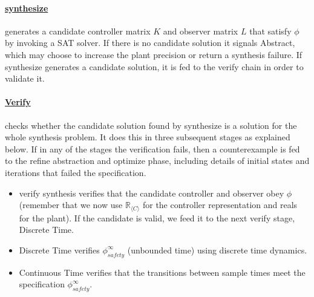 \documentclass[sigconf]{llncs}
\newcommand{\mat}[1]{{#1}}
\begin{document}
\paragraph{\underline{{\sc synthesize}}} generates a candidate controller matrix $\mat{K}$
and observer matrix $\mat{L}$ that satisfy
$\phi$ by invoking a SAT solver.
If there is no candidate solution it signals {\sc Abstract}, 
which may choose to increase the plant precision or return a synthesis failure.
If {\sc synthesize} generates a candidate solution, it is fed to the {\sc verify} chain in order to validate it.
%
\paragraph{\underline{{\sc Verify}}} checks whether the candidate
solution found by {\sc synthesize} is a solution for the whole synthesis
problem. It does this in three subsequent stages as explained below.
If  in any of the stages the verification fails, then
a counterexample is fed to the {\sc refine abstraction and optimize} phase,
including details of initial states
and iterations that failed the specification.
\begin{itemize}
\item {\sc verify synthesis}
verifies that the candidate controller
and observer obey $\phi$ (remember that we now use
$\mathbb{R}_{\langle C \rangle}$ for the controller representation
and reals for the plant).  %
If the candidate is valid, we feed
it to the next {\sc verify} stage, {\sc Discrete Time}.
\item {\sc Discrete Time} verifies $\phi_\mathit{safety}^{\infty}$ (unbounded time)
using discrete time dynamics.  %
\item {\sc Continuous Time} verifies that the
transitions between sample times meet the specification $\phi_\mathit{safety}^{\infty}$.  %
\end{itemize}

\end{document}
